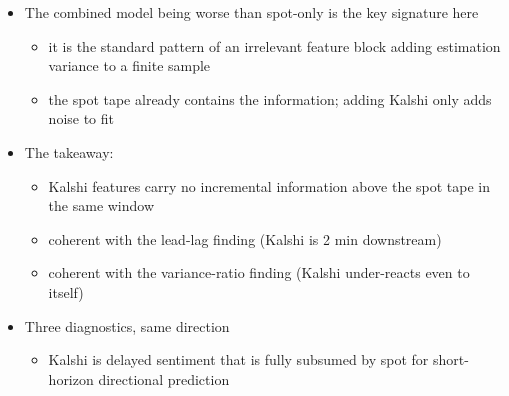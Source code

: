 \documentclass[
]{article}
\providecommand{\tightlist}{%
  \setlength{\itemsep}{0pt}\setlength{\parskip}{0pt}}
\begin{document}
\begin{itemize}
  \begin{itemize}
  \tightlist
  \item
    Spot-only AUC = 0.796, CI {[}0.78, 0.82{]}, 73\% accuracy
  \item
    Kalshi-only AUC = 0.693

    \begin{itemize}
    \tightlist
    \item
      this matches the whitepaper's Extended LR exactly
    \item
      so the sanity check on the Kalshi feature set passes
    \end{itemize}
  \item
    Combined AUC = 0.760

    \begin{itemize}
    \tightlist
    \item
      worse than spot-only
    \item
      DeLong p \textless{} 0.001 for both gaps
    \end{itemize}
  \end{itemize}
\item
  The combined model being worse than spot-only is the key signature
  here

  \begin{itemize}
  \tightlist
  \item
    it is the standard pattern of an irrelevant feature block adding
    estimation variance to a finite sample
  \item
    the spot tape already contains the information; adding Kalshi only
    adds noise to fit
  \end{itemize}
\item
  The takeaway:

  \begin{itemize}
  \tightlist
  \item
    Kalshi features carry no incremental information above the spot tape
    in the same window
  \item
    coherent with the lead-lag finding (Kalshi is 2 min downstream)
  \item
    coherent with the variance-ratio finding (Kalshi under-reacts even
    to itself)
  \end{itemize}
\item
  Three diagnostics, same direction

  \begin{itemize}
  \tightlist
  \item
    Kalshi is delayed sentiment that is fully subsumed by spot for
    short-horizon directional prediction
  \end{itemize}
\end{itemize}
\end{document}
